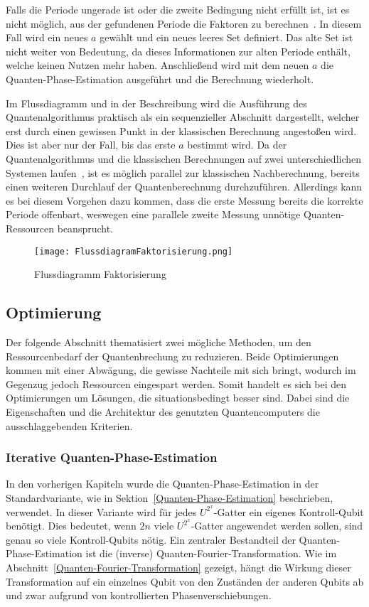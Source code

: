 Falls die Periode ungerade ist oder die zweite Bedingung nicht erfüllt ist, 
ist es nicht möglich, aus der gefundenen Periode die Faktoren zu berechnen~\cite{Shor_1997}.
In diesem Fall wird ein neues \(a\) gewählt und ein neues leeres Set definiert. 
Das alte Set ist nicht weiter von Bedeutung, 
da dieses Informationen zur alten Periode enthält, 
welche keinen Nutzen mehr haben.
Anschließend wird mit dem neuen \(a\) die Quanten-Phase-Estimation ausgeführt und 
die Berechnung wiederholt.

Im Flussdiagramm und in der Beschreibung 
wird die Ausführung des Quantenalgorithmus praktisch als ein sequenzieller Abschnitt dargestellt, 
welcher erst durch einen gewissen Punkt in der klassischen Berechnung angestoßen wird.
Dies ist aber nur der Fall, bis das erste \(a\) bestimmt wird.
Da der Quantenalgorithmus und die klassischen Berechnungen auf zwei unterschiedlichen Systemen laufen~\cite{IBMQuantumServerless2023}, 
ist es möglich parallel zur klassischen Nachberechnung, 
bereits einen weiteren Durchlauf der Quantenberechnung durchzuführen. 
Allerdings kann es bei diesem Vorgehen dazu kommen, 
dass die erste Messung bereits die korrekte Periode offenbart, 
weswegen eine parallele zweite Messung unnötige Quanten-Ressourcen beansprucht.

\begin{figure} 
\caption{Flussdiagramm Faktorisierung}
\label{fig:Flussdiagramm}
\texttt{[image: FlussdiagramFaktorisierung.png]}
\centering
\end{figure}

\subsection{Optimierung} \label{Optimierung}
Der folgende Abschnitt thematisiert zwei mögliche Methoden, 
um den Ressourcenbedarf der Quantenbrechung zu reduzieren.
Beide Optimierungen kommen mit einer Abwägung, 
die gewisse Nachteile mit sich bringt,
wodurch im Gegenzug jedoch Ressourcen eingespart werden.
Somit handelt es sich bei den Optimierungen um Lösungen, 
die situationsbedingt besser sind.
Dabei sind die Eigenschaften und die Architektur des genutzten Quantencomputers die ausschlaggebenden Kriterien.

\subsubsection{Iterative Quanten-Phase-Estimation}
In den vorherigen Kapiteln wurde die Quanten-Phase-Estimation in der Standardvariante, 
wie in Sektion~\ref{Quanten-Phase-Estimation} beschrieben, verwendet.
In dieser Variante wird für jedes \(U^{2^x}\)-Gatter ein eigenes Kontroll-Qubit benötigt.
Dies bedeutet, wenn \(2n\) viele \(U^{2^x}\)-Gatter angewendet werden sollen, 
sind genau so viele Kontroll-Qubits nötig.
Ein zentraler Bestandteil der Quanten-Phase-Estimation ist die (inverse) Quanten-Fourier-Transformation. 
Wie im Abschnitt~\ref{Quanten-Fourier-Transformation} gezeigt, 
hängt die Wirkung dieser Transformation auf ein einzelnes Qubit von den Zuständen der anderen Qubits ab 
und zwar aufgrund von kontrollierten Phasenverschiebungen.

